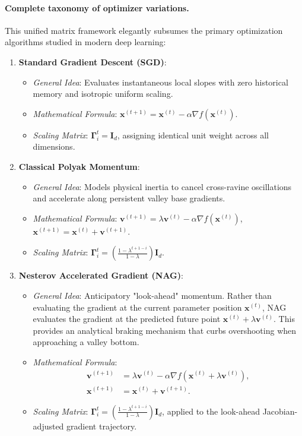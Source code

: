 \paragraph{Complete taxonomy of optimizer variations.}
This unified matrix framework elegantly subsumes the primary optimization algorithms studied in modern deep learning:
\begin{enumerate}
  \item \textbf{Standard Gradient Descent (SGD)}:
    \begin{itemize}[noitemsep]
      \item \textit{General Idea}: Evaluates instantaneous local slopes with zero historical memory and isotropic uniform scaling.
      \item \textit{Mathematical Formula}: $\mathbf{x}^{(t+1)} = \mathbf{x}^{(t)} - \alpha \nabla f(\mathbf{x}^{(t)})$.
      \item \textit{Scaling Matrix}: $\boldsymbol{\Gamma}_i^t = \mathbf{I}_d$, assigning identical unit weight across all dimensions.
    \end{itemize}

  \item \textbf{Classical Polyak Momentum}:
    \begin{itemize}[noitemsep]
      \item \textit{General Idea}: Models physical inertia to cancel cross-ravine oscillations and accelerate along persistent valley base gradients.
      \item \textit{Mathematical Formula}: $\mathbf{v}^{(t+1)} = \lambda \mathbf{v}^{(t)} - \alpha \nabla f(\mathbf{x}^{(t)})$, $\mathbf{x}^{(t+1)} = \mathbf{x}^{(t)} + \mathbf{v}^{(t+1)}$.
      \item \textit{Scaling Matrix}: $\boldsymbol{\Gamma}_i^t = \left(\frac{1 - \lambda^{t+1-i}}{1 - \lambda}\right)\mathbf{I}_d$.
    \end{itemize}

  \item \textbf{Nesterov Accelerated Gradient (NAG)}:
    \begin{itemize}[noitemsep]
      \item \textit{General Idea}: Anticipatory "look-ahead" momentum. Rather than evaluating the gradient at the current parameter position $\mathbf{x}^{(t)}$, NAG evaluates the gradient at the predicted future point $\mathbf{x}^{(t)} + \lambda \mathbf{v}^{(t)}$. This provides an analytical braking mechanism that curbs overshooting when approaching a valley bottom.
      \item \textit{Mathematical Formula}:
        \begin{align}
        \mathbf{v}^{(t+1)} &= \lambda \mathbf{v}^{(t)} - \alpha \nabla f\left(\mathbf{x}^{(t)} + \lambda \mathbf{v}^{(t)}\right), \\
        \mathbf{x}^{(t+1)} &= \mathbf{x}^{(t)} + \mathbf{v}^{(t+1)}.
        \end{align}
      \item \textit{Scaling Matrix}: $\boldsymbol{\Gamma}_i^t = \left(\frac{1 - \lambda^{t+1-i}}{1 - \lambda}\right)\mathbf{I}_d$, applied to the look-ahead Jacobian-adjusted gradient trajectory.
    \end{itemize}


\end{enumerate}
